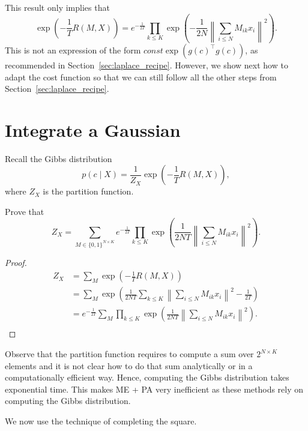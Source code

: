 This result only implies that
%
\begin{equation}
\exp\left(-\frac{1}{T}R(M, X)\right) = e^{-\frac{1}{2T}}\prod_{k \leq K}\exp\left(-\frac{1}{2N}\left\|\sum_{i \leq N}M_{ik}x_i\right\|^2\right).
\end{equation}
%
This is not an expression of the form $\textit{const} \exp\left(g(c)^\top g(c)\right)$, as recommended in Section~\ref{sec:laplace_recipe}. However, we show next how to adapt the cost function so that we can still follow all the other steps from Section~\ref{sec:laplace_recipe}.

\section{Integrate a Gaussian}

Recall the Gibbs distribution
%
$$p(c \mid X) = \frac{1}{Z_X}\exp\left(-\frac{1}{T}R(M, X)\right),$$
%
where $Z_X$ is the partition function. 

\begin{exercise}
Prove that
%
\begin{equation}
Z_X = \sum_{M \in \{0, 1\}^{N \times K}}e^{-\frac{1}{2T}}\prod_{k \leq K} \exp\left(\frac{1}{2NT}\left\|\sum_{i \leq N} M_{ik}x_i\right\|^2\right).
\label{eq:partition_function}
\end{equation}
%
\end{exercise}

\begin{proof}
\begin{align*}
Z_X &= \sum_{M} \exp\left(-\frac{1}{T}R(M, X)\right)\\
&= \sum_{M} \exp\left(\frac{1}{2NT}\sum_{k \leq K}\left\|\sum_{i \leq N} M_{ik}x_i\right\|^2 - \frac{1}{2T}\right)\\
&= e^{-\frac{1}{2T}}\sum_{M} \prod_{k \leq K}\exp\left(\frac{1}{2NT}\left\|\sum_{i \leq N} M_{ik}x_i\right\|^2\right).\\
\end{align*}
\end{proof}

Observe that the partition function requires to compute a sum over $2^{N \times K}$ elements and it is not clear how to do that sum analytically or in a computationally efficient way. Hence, computing the Gibbs distribution takes exponential time. This makes ME + PA very inefficient as these methods rely on computing the Gibbs distribution.

We now use the technique of completing the square.

